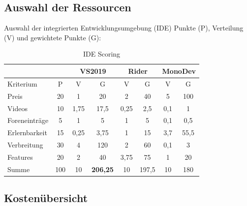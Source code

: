 \documentclass[toc]{beamer}
\begin{document}
\subsection{Auswahl der Ressourcen}
    \begin{frame}{Auswahl der integrierten Entwicklungsumgebung (IDE)}
    Punkte (P), Verteilung (V) und gewichtete Punkte (G):
        \begin{table}[ht]

		\begin{tabular}{|| l | c | c | c | c | c | c | c ||}
	    \hline	
	    
	    \multicolumn{2}{||c|}{} & \multicolumn{2}{|c|}{VS2019}  & \multicolumn{2}{|c|}{Rider}  & \multicolumn{2}{|c||}{MonoDev}   \\
	    \hline
	    Kriterium & P & V & G  & V & G & V & G \\
	    \hline
	    Preis & 20 & 1 & 20 & 2 & 40 & 5 & 100 \\
	    Videos & 10 & 1,75 & 17,5 & 0,25 & 2,5 & 0,1 & 1 \\
	    Foreneinträge & 5 & 1 & 5 & 1 & 5 & 0,1 & 0,5 \\
	    Erlernbarkeit & 15 & 0,25 & 3,75 & 1 & 15 & 3,7 & 55,5 \\
	    Verbreitung & 30 & 4 & 120 & 2 & 60 & 0,1 & 3 \\
	    Features & 20 & 2 & 40 & 3,75 & 75 & 1 & 20 \\
	    \hline
	    Summe & 100 & 10 & \textbf{206,25} & 10 & 197,5 & 10 & 180 \\
	    
		\hline
		
		
	
		
			\end{tabular}
			\caption{IDE Scoring}
			\end{table}
    \end{frame}

\subsection{Kostenübersicht}
    
\end{document}
